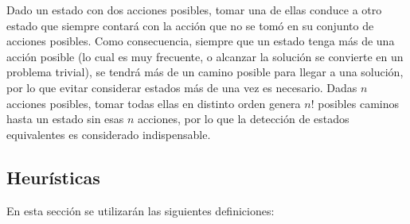 \documentclass[a4paper,10pt]{article}
\begin{document}
    Dado un estado con dos acciones posibles, tomar una de ellas conduce a otro estado que siempre contará con la acción que no se tomó en su conjunto de acciones posibles. Como consecuencia, siempre que un estado tenga más de una acción posible (lo cual es muy frecuente, o alcanzar la solución se convierte en un problema trivial), se tendrá más de un camino posible para llegar a una solución, por lo que evitar considerar estados más de una vez es necesario. Dadas $n$ acciones posibles, tomar todas ellas en distinto orden genera $n!$ posibles caminos hasta un estado sin esas $n$ acciones, por lo que la detección de estados equivalentes es considerado indispensable.

\subsection{Heurísticas}

    En esta sección se utilizarán las siguientes definiciones:
\end{document}
